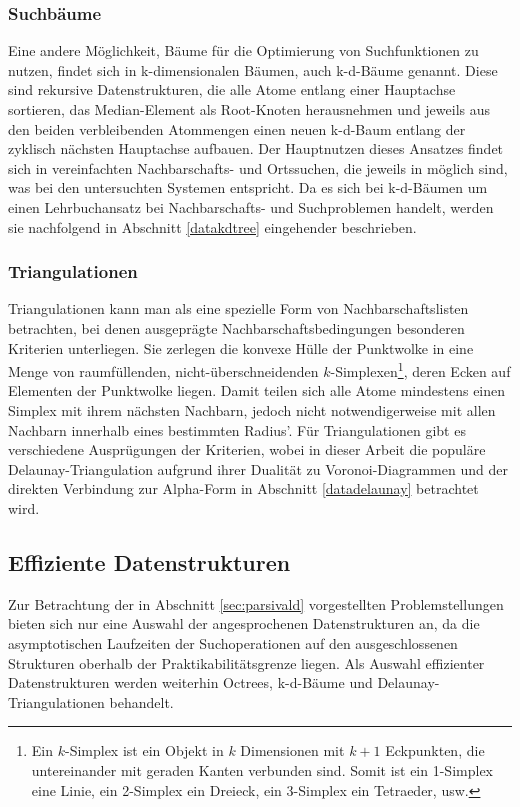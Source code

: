 \subsubsection{Suchbäume}

Eine andere Möglichkeit, Bäume für die Optimierung von Suchfunktionen zu nutzen, findet sich in k-dimensionalen Bäumen, auch k-d-Bäume genannt.
Diese sind rekursive Datenstrukturen, die alle Atome entlang einer Hauptachse sortieren, das Median-Element als Root-Knoten herausnehmen und jeweils aus den beiden verbleibenden Atommengen einen neuen k-d-Baum entlang der zyklisch nächsten Hauptachse aufbauen.
Der Hauptnutzen dieses Ansatzes findet sich in vereinfachten Nachbarschafts- und Ortssuchen, die jeweils in  möglich sind, was bei den untersuchten Systemen  entspricht.
Da es sich bei k-d-Bäumen um einen Lehrbuchansatz bei Nachbarschafts- und Suchproblemen handelt, werden sie nachfolgend in Abschnitt \ref{datakdtree} eingehender beschrieben.

\subsubsection{Triangulationen}

Triangulationen kann man als eine spezielle Form von Nachbarschaftslisten betrachten, bei denen ausgeprägte Nachbarschaftsbedingungen besonderen Kriterien unterliegen.
Sie zerlegen die konvexe Hülle der Punktwolke in eine Menge von raumfüllenden, nicht-überschneidenden $k$-Simplexen\footnote{Ein $k$-Simplex ist ein Objekt in $k$ Dimensionen mit $k+1$ Eckpunkten, die untereinander mit geraden Kanten verbunden sind. Somit ist ein 1-Simplex eine Linie, ein 2-Simplex ein Dreieck, ein 3-Simplex ein Tetraeder, usw.}, deren Ecken auf Elementen der Punktwolke liegen.
Damit teilen sich alle Atome mindestens einen Simplex mit ihrem nächsten Nachbarn, jedoch nicht notwendigerweise mit allen Nachbarn innerhalb eines bestimmten Radius'.
Für Triangulationen gibt es verschiedene Ausprügungen der Kriterien, wobei in dieser Arbeit die populäre Delaunay-Triangulation aufgrund ihrer Dualität zu Voronoi-Diagrammen und der direkten Verbindung zur Alpha-Form in Abschnitt \ref{datadelaunay} betrachtet wird.

\subsection{Effiziente Datenstrukturen}

Zur Betrachtung der in Abschnitt \ref{sec:parsivald} vorgestellten Problemstellungen bieten sich nur eine Auswahl der angesprochenen Datenstrukturen an, da die asymptotischen Laufzeiten der Suchoperationen auf den ausgeschlossenen Strukturen oberhalb der Praktikabilitätsgrenze liegen.
Als Auswahl effizienter Datenstrukturen werden weiterhin Octrees, k-d-Bäume und Delaunay-Triangulationen behandelt.

